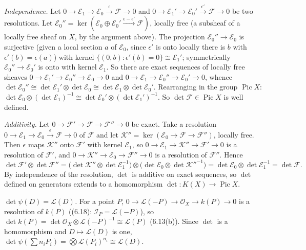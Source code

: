 \documentclass[11pt]{article}
\begin{document}
\emph{Independence.} Let $0\to\mathcal E_1\to\mathcal E_0\xrightarrow{\ \epsilon\ }\mathcal F\to0$ and $0\to\mathcal E_1'\to\mathcal E_0'\xrightarrow{\ \epsilon'\ }\mathcal F\to0$ be two resolutions. Let $\mathcal E_0''=\ker(\mathcal E_0\oplus\mathcal E_0'\xrightarrow{\epsilon-\epsilon'}\mathcal F)$, locally free (a subsheaf of a locally free sheaf on $X$, by the argument above). The projection $\mathcal E_0''\to\mathcal E_0$ is surjective (given a local section $a$ of $\mathcal E_0$, since $\epsilon'$ is onto locally there is $b$ with $\epsilon'(b)=\epsilon(a)$) with kernel $\{(0,b):\epsilon'(b)=0\}\cong\mathcal E_1'$; symmetrically $\mathcal E_0''\to\mathcal E_0'$ is onto with kernel $\mathcal E_1$. So there are exact sequences of locally free sheaves $0\to\mathcal E_1'\to\mathcal E_0''\to\mathcal E_0\to0$ and $0\to\mathcal E_1\to\mathcal E_0''\to\mathcal E_0'\to0$, whence $\det\mathcal E_0''\cong\det\mathcal E_1'\otimes\det\mathcal E_0\cong\det\mathcal E_1\otimes\det\mathcal E_0'$. Rearranging in the group $\operatorname{Pic}X$: $\det\mathcal E_0\otimes(\det\mathcal E_1)^{-1}\cong\det\mathcal E_0'\otimes(\det\mathcal E_1')^{-1}$. So $\det\mathcal F\in\operatorname{Pic}X$ is well defined.

\emph{Additivity.} Let $0\to\mathcal F'\to\mathcal F\to\mathcal F''\to0$ be exact. Take a resolution $0\to\mathcal E_1\to\mathcal E_0\xrightarrow{\epsilon}\mathcal F\to0$ of $\mathcal F$ and let $\mathcal K''=\ker(\mathcal E_0\to\mathcal F\to\mathcal F'')$, locally free. Then $\epsilon$ maps $\mathcal K''$ onto $\mathcal F'$ with kernel $\mathcal E_1$, so $0\to\mathcal E_1\to\mathcal K''\to\mathcal F'\to0$ is a resolution of $\mathcal F'$, and $0\to\mathcal K''\to\mathcal E_0\to\mathcal F''\to0$ is a resolution of $\mathcal F''$. Hence
\[
\det\mathcal F'\otimes\det\mathcal F''=\bigl(\det\mathcal K''\otimes\det\mathcal E_1^{-1}\bigr)\otimes\bigl(\det\mathcal E_0\otimes\det\mathcal K''^{-1}\bigr)=\det\mathcal E_0\otimes\det\mathcal E_1^{-1}=\det\mathcal F.
\]
By independence of the resolution, $\det$ is additive on exact sequences, so $\det$ defined on generators extends to a homomorphism $\det:K(X)\to\operatorname{Pic}X$.

\emph{$\det\psi(D)=\mathcal L(D)$.} For a point $P$, $0\to\mathcal L(-P)\to\mathcal O_X\to k(P)\to0$ is a resolution of $k(P)$ ((6.18): $\mathcal I_P=\mathcal L(-P)$), so $\det k(P)=\det\mathcal O_X\otimes\mathcal L(-P)^{-1}\cong\mathcal L(P)$ (6.13(b)). Since $\det$ is a homomorphism and $D\mapsto\mathcal L(D)$ is one, $\det\psi(\sum n_iP_i)=\bigotimes\mathcal L(P_i)^{n_i}\cong\mathcal L(D)$.
\end{document}
